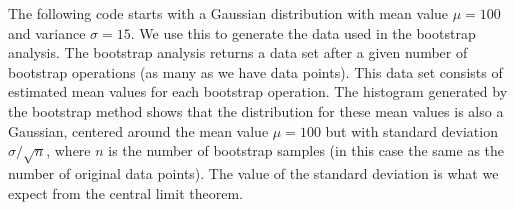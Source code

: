 The following code starts with a Gaussian distribution with mean value $\mu =100$ and variance $\sigma=15$. We use this to generate the data used in the bootstrap analysis. The bootstrap analysis returns a data set after a given number of bootstrap operations (as many as we have data points). This data set consists of estimated mean values for each bootstrap operation. The histogram generated by the bootstrap method shows that the distribution for these mean values is also a Gaussian, centered around the mean value $\mu=100$ but with standard deviation $\sigma/\sqrt{n}$, where $n$ is the number of bootstrap samples (in this case the same as the number of original data points). The value of the standard deviation is what we expect from the central limit theorem. 


















































